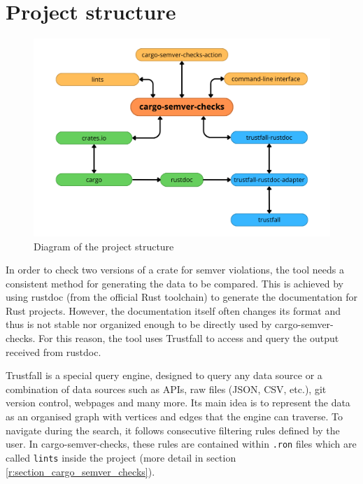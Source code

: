 \documentclass[licencjacka,en]{pracamgr}
\begin{document}
\section{Project structure}\label{r:section_project_structure}

\begin{figure}[h]
	\centering
	\includegraphics[width=\linewidth]{project-structure-diagram.png}
	\caption{Diagram of the project structure}
\end{figure}

In order to check two versions of a crate for semver violations, the tool needs a consistent method
for generating the data to be compared. This is achieved by using rustdoc (from the official
Rust toolchain) to generate the documentation for Rust projects. However, the documentation itself
often changes its format and thus is not stable nor organized enough to be directly used by
cargo-semver-checks. For this reason, the tool uses Trustfall to access and query the output
received from rustdoc.

Trustfall is a special query engine, designed to query any data source or a combination of data
sources such as APIs, raw files (JSON, CSV, etc.), git version control, webpages and many more.
Its main idea is to represent the data as an organised graph with vertices and edges that the
engine can traverse. To navigate during the search, it follows consecutive filtering rules defined
by the user. In cargo-semver-checks, these rules are contained within \texttt{.ron} files which
are called \texttt{lints} inside the project (more detail in section
\ref{r:section_cargo_semver_checks}).
\end{document}

